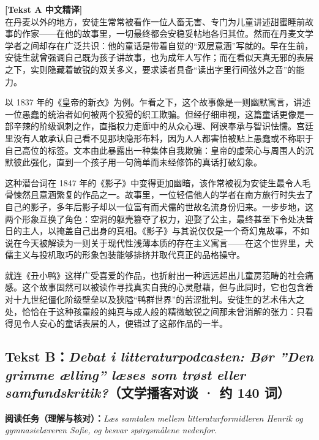 \begin{transbox}
\small
\textbf{\color{NCDTeal}[Tekst A 中文精译]}\\
在丹麦以外的地方，安徒生常常被看作一位人畜无害、专门为儿童讲述甜蜜睡前故事的作家——在他的故事里，一切最终都会安稳妥帖地各归其位。然而在丹麦文学学者之间却存在广泛共识：他的童话是带着自觉的“双层意涵”写就的。早在生前，安徒生就曾强调自己既为孩子讲故事，也为成年人写作；而在看似天真无邪的表层之下，实则隐藏着敏锐的双关多义，要求读者具备“读出字里行间弦外之音”的能力。

以 1837 年的《皇帝的新衣》为例。乍看之下，这个故事像是一则幽默寓言，讲述一位愚蠢的统治者如何被两个狡猾的织工欺骗。但经仔细审视，这篇童话更像是一部辛辣的阶级讽刺之作，直指权力走廊中的从众心理、阿谀奉承与智识怯懦。宫廷里没有人敢承认自己看不见那块隐形布料，因为人人都害怕被贴上愚蠢或不称职于自己高位的标签。文本由此暴露出一种集体自我欺骗：皇帝的虚荣心与周围人的沉默彼此强化，直到一个孩子用一句简单而未经修饰的真话打破幻象。

这种潜台词在 1847 年的《影子》中变得更加幽暗，该作常被视为安徒生最令人毛骨悚然且意涵繁复的作品之一。故事里，一位轻信他人的学者在南方旅行时失去了自己的影子，多年后影子却以一位富有而犬儒的世故名流身份归来。一步步地，这两个形象互换了角色：空洞的躯壳篡夺了权力，迎娶了公主，最终甚至下令处决昔日的主人，以掩盖自己出身的真相。《影子》与其说仅仅是一个奇幻鬼故事，不如说在今天被解读为一则关于现代性浅薄本质的存在主义寓言——在这个世界里，犬儒主义与投机取巧的形象包装能够排挤并取代真正的品格操守。

就连《丑小鸭》这样广受喜爱的作品，也折射出一种远远超出儿童房范畴的社会痛感。这个故事固然可以被读作寻找真实自我的心灵慰藉，但与此同时，它也包含着对十九世纪僵化阶级壁垒以及狭隘“鸭群世界”的苦涩批判。安徒生的艺术伟大之处，恰恰在于这种孩童般的纯真与成人般的精微敏锐之间那未曾消解的张力：只看得见令人安心的童话表层的人，便错过了这部作品的一半。
\end{transbox}

\subsection*{Tekst B：\textit{Debat i litteraturpodcasten: Bør ”Den grimme ælling” læses som trøst eller samfundskritik?}（文学播客对谈 · 约 140 词）}

\textbf{阅读任务（理解与核对）：}\textit{Læs samtalen mellem litteraturformidleren Henrik og gymnasielæreren Sofie, og besvar spørgsmålene nedenfor.}

